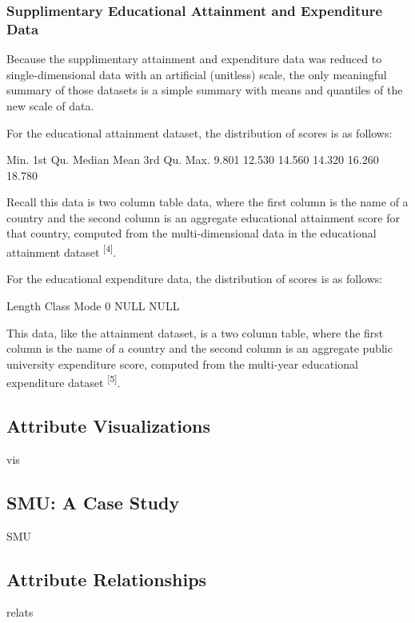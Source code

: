 \documentclass[12pt]{article}
\begin{document}
\subsubsection{Supplimentary Educational Attainment and Expenditure Data}
Because the supplimentary attainment and expenditure data was reduced to single-dimensional data with an artificial (unitless) scale, the only meaningful summary of those datasets is a simple summary with means and quantiles of the new scale of data.

For the educational attainment dataset, the distribution of scores is as follows:
\begin{Schunk}
\begin{Soutput}
   Min. 1st Qu.  Median    Mean 3rd Qu.    Max. 
  9.801  12.530  14.560  14.320  16.260  18.780 
\end{Soutput}
\end{Schunk}
Recall this data is two column table data, where the first column is the name of a country and the second column is an aggregate educational attainment score for that country, computed from the multi-dimensional data in the educational attainment dataset \textsuperscript{[4]}.

For the educational expenditure data, the distribution of scores is as follows:
\begin{Schunk}
\begin{Soutput}
Length  Class   Mode 
     0   NULL   NULL 
\end{Soutput}
\end{Schunk}
This data, like the attainment dataset, is a two column table, where the first column is the name of a country and the second column is an aggregate public university expenditure score, computed from the multi-year educational expenditure dataset \textsuperscript{[5]}.

\subsection{Attribute Visualizations}
vis

\subsection{SMU: A Case Study}
SMU

\subsection{Attribute Relationships}
relats
\end{document}
